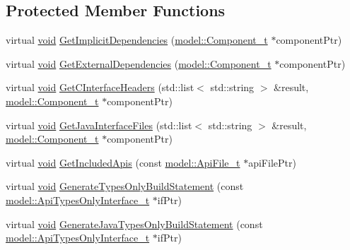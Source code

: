 \subsection*{Protected Member Functions}
\begin{DoxyCompactItemize}
\item 
virtual \hyperlink{_t_e_m_p_l_a_t_e__cdef_8h_ac9c84fa68bbad002983e35ce3663c686}{void} \hyperlink{classninja_1_1_component_build_script_generator__t_a8f696e8e1c7711071c1d9b1e1b500d88}{Get\+Implicit\+Dependencies} (\hyperlink{structmodel_1_1_component__t}{model\+::\+Component\+\_\+t} $\ast$component\+Ptr)
\item 
virtual \hyperlink{_t_e_m_p_l_a_t_e__cdef_8h_ac9c84fa68bbad002983e35ce3663c686}{void} \hyperlink{classninja_1_1_component_build_script_generator__t_a381c507daaa5536f28871f27c68549c9}{Get\+External\+Dependencies} (\hyperlink{structmodel_1_1_component__t}{model\+::\+Component\+\_\+t} $\ast$component\+Ptr)
\item 
virtual \hyperlink{_t_e_m_p_l_a_t_e__cdef_8h_ac9c84fa68bbad002983e35ce3663c686}{void} \hyperlink{classninja_1_1_component_build_script_generator__t_a5a53e430cf515a2395ee3b1c86d7c95e}{Get\+C\+Interface\+Headers} (std\+::list$<$ std\+::string $>$ \&result, \hyperlink{structmodel_1_1_component__t}{model\+::\+Component\+\_\+t} $\ast$component\+Ptr)
\item 
virtual \hyperlink{_t_e_m_p_l_a_t_e__cdef_8h_ac9c84fa68bbad002983e35ce3663c686}{void} \hyperlink{classninja_1_1_component_build_script_generator__t_a7c87e520504632b101c3eee06a8e31ee}{Get\+Java\+Interface\+Files} (std\+::list$<$ std\+::string $>$ \&result, \hyperlink{structmodel_1_1_component__t}{model\+::\+Component\+\_\+t} $\ast$component\+Ptr)
\item 
virtual \hyperlink{_t_e_m_p_l_a_t_e__cdef_8h_ac9c84fa68bbad002983e35ce3663c686}{void} \hyperlink{classninja_1_1_component_build_script_generator__t_ab054e017980f4254dfd2e4291c95783c}{Get\+Included\+Apis} (const \hyperlink{structmodel_1_1_api_file__t}{model\+::\+Api\+File\+\_\+t} $\ast$api\+File\+Ptr)
\item 
virtual \hyperlink{_t_e_m_p_l_a_t_e__cdef_8h_ac9c84fa68bbad002983e35ce3663c686}{void} \hyperlink{classninja_1_1_component_build_script_generator__t_acd013442b701b566286ca9cd1957017f}{Generate\+Types\+Only\+Build\+Statement} (const \hyperlink{structmodel_1_1_api_types_only_interface__t}{model\+::\+Api\+Types\+Only\+Interface\+\_\+t} $\ast$if\+Ptr)
\item 
virtual \hyperlink{_t_e_m_p_l_a_t_e__cdef_8h_ac9c84fa68bbad002983e35ce3663c686}{void} \hyperlink{classninja_1_1_component_build_script_generator__t_a03df816a78db77f497bc5ba30b313525}{Generate\+Java\+Types\+Only\+Build\+Statement} (const \hyperlink{structmodel_1_1_api_types_only_interface__t}{model\+::\+Api\+Types\+Only\+Interface\+\_\+t} $\ast$if\+Ptr)

\end{DoxyCompactItemize}
